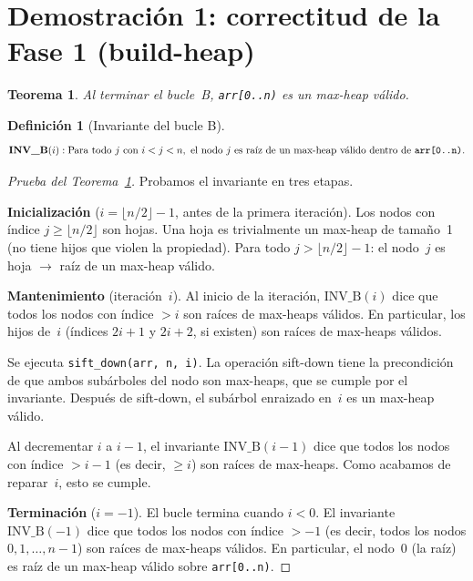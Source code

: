 \documentclass[11pt, letterpaper]{article}
\theoremstyle{definition}
\newtheorem{definition}{Definición}[section]
\theoremstyle{plain}
\newtheorem{theorem}{Teorema}[section]
\theoremstyle{remark}
\begin{document}
\section{Demostración 1: correctitud de la Fase 1 (build-heap)}

\begin{theorem}\label{thm:build}
Al terminar el bucle~B, \texttt{arr[0..n)} es un max-heap válido.
\end{theorem}

\begin{definition}[Invariante del bucle B]
\[
  \textbf{INV\_B}(i): \text{Para todo } j \text{ con } i < j < n,
  \text{ el nodo } j \text{ es raíz de un max-heap válido dentro de
  \texttt{arr[0..n)}}.
\]
\end{definition}

\begin{proof}[Prueba del Teorema~\ref{thm:build}]
Probamos el invariante en tres etapas.

\textbf{Inicialización} ($i = \lfloor n/2 \rfloor - 1$, antes de la
primera iteración). Los nodos con índice $j \geq \lfloor n/2 \rfloor$
son hojas. Una hoja es trivialmente un max-heap de tamaño~1 (no tiene
hijos que violen la propiedad). Para todo
$j > \lfloor n/2 \rfloor - 1$: el nodo~$j$ es hoja $\to$ raíz de un
max-heap válido. \checkmark

\textbf{Mantenimiento} (iteración~$i$). Al inicio de la iteración,
$\text{INV\_B}(i)$ dice que todos los nodos con índice $> i$ son
raíces de max-heaps válidos. En particular, los hijos de~$i$ (índices
$2i+1$ y $2i+2$, si existen) son raíces de max-heaps válidos.

Se ejecuta \texttt{sift\_down(arr, n, i)}. La operación sift-down
tiene la precondición de que ambos subárboles del nodo son max-heaps,
que se cumple por el invariante. Después de sift-down, el subárbol
enraizado en~$i$ es un max-heap válido.

Al decrementar $i$ a $i-1$, el invariante $\text{INV\_B}(i-1)$ dice
que todos los nodos con índice $> i - 1$ (es decir, $\geq i$) son
raíces de max-heaps. Como acabamos de reparar~$i$, esto se cumple.
\checkmark

\textbf{Terminación} ($i = -1$). El bucle termina cuando $i < 0$. El
invariante $\text{INV\_B}(-1)$ dice que todos los nodos con índice
$> -1$ (es decir, todos los nodos $0, 1, \ldots, n{-}1$) son raíces
de max-heaps válidos. En particular, el nodo~0 (la raíz) es raíz de
un max-heap válido sobre \texttt{arr[0..n)}.
\end{proof}
\end{document}
